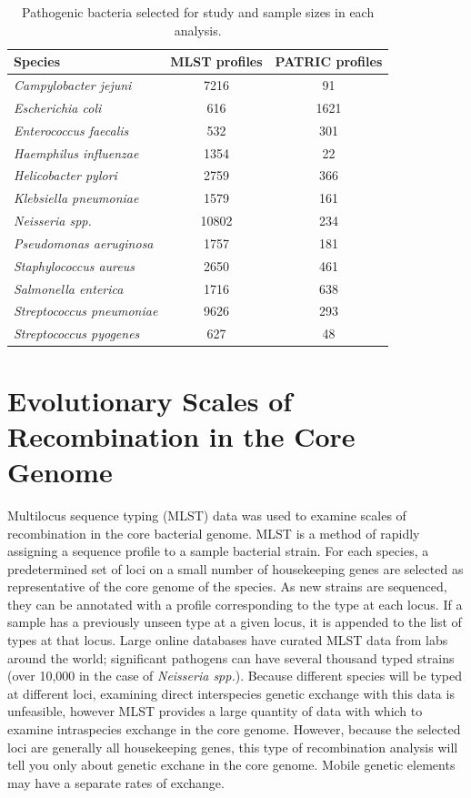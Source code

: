 \begin{table}
\centering
\caption[List of pathogenic bacteria selected for study]{Pathogenic bacteria selected for study and sample sizes in each analysis.}
\begin{tabularx}{\textwidth}{Xcc}
\toprule
Species & \hspace{10mm}MLST profiles\hspace{10mm} & PATRIC profiles \\
\midrule
\emph{Campylobacter jejuni}      & 7216  & 91 \\
\emph{Escherichia coli}          & 616   & 1621 \\
\emph{Enterococcus faecalis}     & 532   & 301 \\
\emph{Haemphilus influenzae}     & 1354  & 22 \\
\emph{Helicobacter pylori}       & 2759  & 366 \\
\emph{Klebsiella pneumoniae}     & 1579  & 161 \\
\emph{Neisseria spp.}            & 10802 & 234 \\
\emph{Pseudomonas aeruginosa}    & 1757  & 181 \\
\emph{Staphylococcus aureus}     & 2650  & 461 \\
\emph{Salmonella enterica}       & 1716  & 638 \\
\emph{Streptococcus pneumoniae}  & 9626  & 293 \\
\emph{Streptococcus pyogenes}    & 627   & 48 \\
\bottomrule
\end{tabularx}
\label{table:samplesizes}
\end{table}

\section{Evolutionary Scales of Recombination in the Core Genome}
\label{pathogens:mlst}
%
Multilocus sequence typing (MLST) data was used to examine scales of recombination in the core bacterial genome.
MLST is a method of rapidly assigning a sequence profile to a sample bacterial strain.
For each species, a predetermined set of loci on a small number of housekeeping genes are selected as representative of the core genome of the species.
As new strains are sequenced, they can be annotated with a profile corresponding to the type at each locus.
If a sample has a previously unseen type at a given locus, it is appended to the list of types at that locus.
Large online databases have curated MLST data from labs around the world; significant pathogens can have several thousand typed strains (over 10,000 in the case of \emph{Neisseria spp.}).
Because different species will be typed at different loci, examining direct interspecies genetic exchange with this data is unfeasible, however MLST provides a large quantity of data with which to examine intraspecies exchange in the core genome.
However, because the selected loci are generally all housekeeping genes, this type of recombination analysis will tell you only about genetic exchane in the core genome.
Mobile genetic elements may have a separate rates of exchange.

